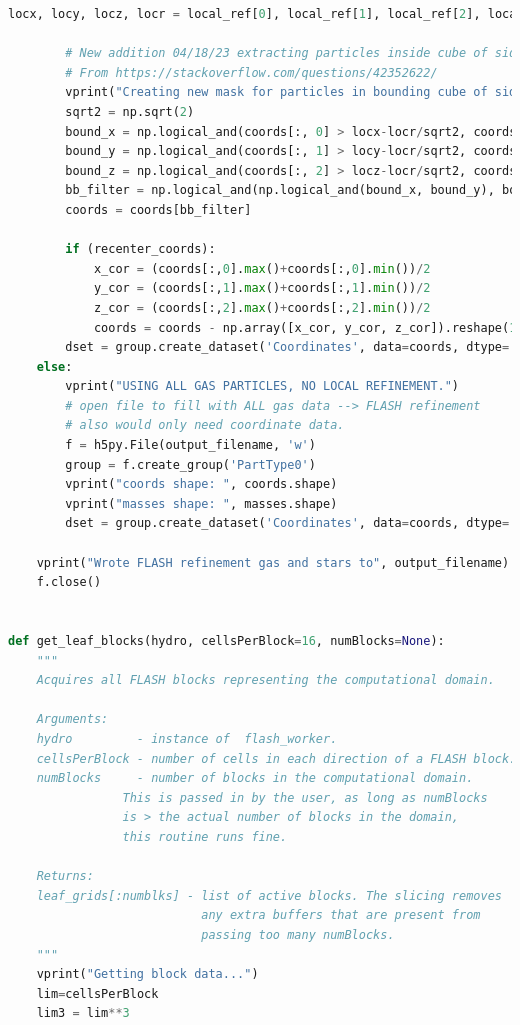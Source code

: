 \documentclass[twoside]{drexel-thesis}
\begin{document}
\begin{lstlisting}[language=python]
        locx, locy, locz, locr = local_ref[0], local_ref[1], local_ref[2], local_ref[3]

        # New addition 04/18/23 extracting particles inside cube of side 2/sqrt(2)*locr centered at loc{x,y,z}
        # From https://stackoverflow.com/questions/42352622/
        vprint("Creating new mask for particles in bounding cube of side 2*locr/sqrt(2)")
        sqrt2 = np.sqrt(2)
        bound_x = np.logical_and(coords[:, 0] > locx-locr/sqrt2, coords[:, 0] < locx+locr/sqrt2)
        bound_y = np.logical_and(coords[:, 1] > locy-locr/sqrt2, coords[:, 1] < locy+locr/sqrt2)
        bound_z = np.logical_and(coords[:, 2] > locz-locr/sqrt2, coords[:, 2] < locz+locr/sqrt2)
        bb_filter = np.logical_and(np.logical_and(bound_x, bound_y), bound_z)
        coords = coords[bb_filter]

        if (recenter_coords):
            x_cor = (coords[:,0].max()+coords[:,0].min())/2
            y_cor = (coords[:,1].max()+coords[:,1].min())/2
            z_cor = (coords[:,2].max()+coords[:,2].min())/2
            coords = coords - np.array([x_cor, y_cor, z_cor]).reshape(1,3)
        dset = group.create_dataset('Coordinates', data=coords, dtype='d')
    else:
        vprint("USING ALL GAS PARTICLES, NO LOCAL REFINEMENT.")
        # open file to fill with ALL gas data --> FLASH refinement
        # also would only need coordinate data.
        f = h5py.File(output_filename, 'w')
        group = f.create_group('PartType0')
        vprint("coords shape: ", coords.shape)
        vprint("masses shape: ", masses.shape)
        dset = group.create_dataset('Coordinates', data=coords, dtype='d')

    vprint("Wrote FLASH refinement gas and stars to", output_filename)
    f.close()


def get_leaf_blocks(hydro, cellsPerBlock=16, numBlocks=None):
    """
    Acquires all FLASH blocks representing the computational domain.
    
    Arguments:
    hydro         - instance of  flash_worker.
    cellsPerBlock - number of cells in each direction of a FLASH block.
    numBlocks     - number of blocks in the computational domain. 
                This is passed in by the user, as long as numBlocks 
                is > the actual number of blocks in the domain, 
                this routine runs fine. 

    Returns:
    leaf_grids[:numblks] - list of active blocks. The slicing removes
                           any extra buffers that are present from
                           passing too many numBlocks.
    """
    vprint("Getting block data...")
    lim=cellsPerBlock
    lim3 = lim**3


\end{lstlisting}
\end{document}

